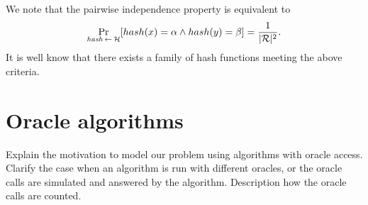 We note that the pairwise independence property is equivalent to
\begin{displaymath}
\underset{\hash \la0 \cH}{\Pr}[hash(x) = \alpha \land hash(y) = \beta] = \frac{1}{|\cR|^2}.
\end{displaymath}
It is well know \cite{Carter:1977:UCH:800105.803400} that there exists a family of hash functions meeting the above criteria.


\section{Oracle algorithms}
Explain the motivation to model our problem using algorithms with oracle access.
Clarify the case when an algorithm is run with different oracles, or the oracle calls are simulated and answered by the algorithm.
Description how the oracle calls are counted.


